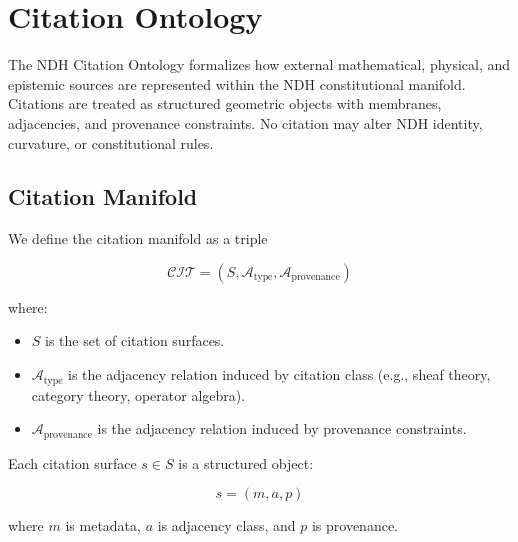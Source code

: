 
\section{Citation Ontology}
\label{sec:citation-ontology}

The NDH Citation Ontology formalizes how external mathematical,
physical, and epistemic sources are represented within the NDH
constitutional manifold. Citations are treated as structured
geometric objects with membranes, adjacencies, and provenance
constraints. No citation may alter NDH identity, curvature,
or constitutional rules.


\subsection{Citation Manifold}

We define the citation manifold as a triple

\[
\mathcal{CIT} = (S, \mathcal{A}_{\mathrm{type}}, 
\mathcal{A}_{\mathrm{provenance}})
\]

where:

\begin{itemize}
    \item $S$ is the set of citation surfaces.
    \item $\mathcal{A}_{\mathrm{type}}$ is the adjacency relation
          induced by citation class (e.g., sheaf theory, category
          theory, operator algebra).
    \item $\mathcal{A}_{\mathrm{provenance}}$ is the adjacency
          relation induced by provenance constraints.
\end{itemize}

Each citation surface $s \in S$ is a structured object:

\[
s = (m, a, p)
\]

where $m$ is metadata, $a$ is adjacency class, and $p$ is provenance.


